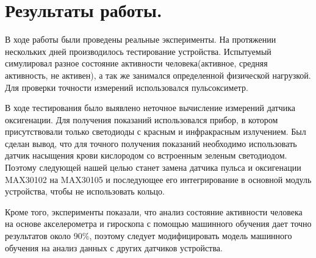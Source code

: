 \documentclass[a4document]{article}
\begin{document}
{
\newpage
\section*{Результаты работы.} 
В ходе работы были проведены реальные эксперименты. На протяжении \\
нескольких дней производилось тестирование устройства.
Испытуемый симулировал разное состояние активности человека(активное, средняя активность, не активен), 
а так же занимался определенной физической нагрузкой. 
Для проверки точности измерений использовался пульсоксиметр. 
\par \noindent
В ходе тестирования было выявлено неточное вычисление измерений датчика оксигенации.
Для получения показаний использовался прибор, в котором присутствовали только светодиоды
с красным и инфракрасным излучением. Был сделан вывод, что для точного получения показаний необходимо 
использовать датчик насыщения крови кислородом со встроенным зеленым светодиодом.
Поэтому следующей нашей целью станет замена датчика пульса и оксигенации MAX30102 на MAX30105 и
последующее его интегрирование в основной модуль устройства, чтобы не использовать кольцо.
\par \noindent
Кроме того, эксперименты показали, что анализ состояние активности человека на основе 
акселерометра и гироскопа с помощью машинного обучения дает точно результатов около 90\%, 
поэтому следует модифицировать модель машинного обучения на анализ данных с других датчиков устройства.



}
\end{document}
